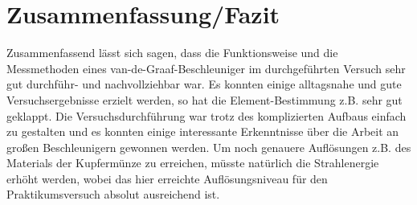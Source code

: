 \section{Zusammenfassung/Fazit}
Zusammenfassend lässt sich sagen, dass die Funktionsweise und die Messmethoden eines van-de-Graaf-Beschleuniger im durchgeführten Versuch sehr gut durchführ- und nachvollziehbar war. Es konnten einige alltagsnahe und gute Versuchsergebnisse erzielt werden, so hat die Element-Bestimmung z.B. sehr gut geklappt. Die Versuchsdurchführung war trotz des komplizierten Aufbaus einfach zu gestalten und es konnten einige interessante Erkenntnisse über die Arbeit an großen Beschleunigern gewonnen werden. Um noch genauere Auflösungen z.B. des Materials der Kupfermünze zu erreichen, müsste natürlich die Strahlenergie erhöht werden, wobei das hier erreichte Auflösungsniveau für den Praktikumsversuch absolut ausreichend ist. 